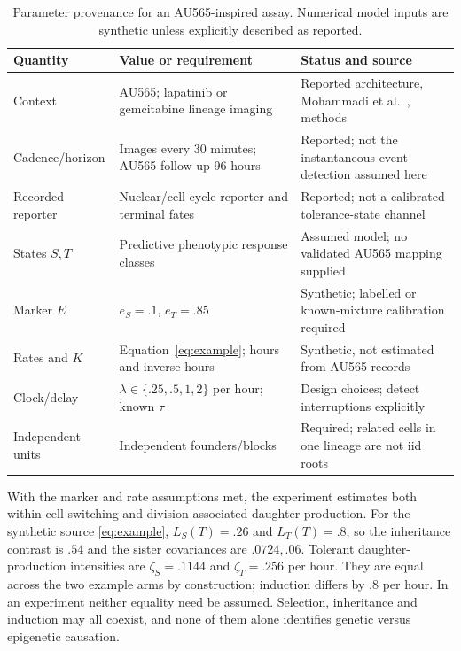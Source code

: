 \documentclass[11pt]{article}
\theoremstyle{definition}
\begin{document}
\begin{table}[tb]
\caption{Parameter provenance for an AU565-inspired assay. Numerical model
inputs are synthetic unless explicitly described as reported.}
\label{tab:provenance}\centering\small
\begin{tabular}{>{\raggedright\arraybackslash}p{.20\linewidth}>{\raggedright\arraybackslash}p{.35\linewidth}>{\raggedright\arraybackslash}p{.35\linewidth}}
\toprule
Quantity & Value or requirement & Status and source\\
\midrule
Context & AU565; lapatinib or gemcitabine lineage imaging & Reported architecture, Mohammadi et al.~\citep{mohammadi2022}, methods\\
Cadence/horizon & Images every 30 minutes; AU565 follow-up 96 hours & Reported; not the instantaneous event detection assumed here\\
Recorded reporter & Nuclear/cell-cycle reporter and terminal fates & Reported; not a calibrated tolerance-state channel\\
States $S,T$ & Predictive phenotypic response classes & Assumed model; no validated AU565 mapping supplied\\
Marker $E$ & $e_S=.1$, $e_T=.85$ & Synthetic; labelled or known-mixture calibration required\\
Rates and $K$ & Equation~\eqref{eq:example}; hours and inverse hours & Synthetic, not estimated from AU565 records\\
Clock/delay & $\lambda\in\{.25,.5,1,2\}$ per hour; known $\tau$ & Design choices; detect interruptions explicitly\\
Independent units & Independent founders/blocks & Required; related cells in one lineage are not iid roots\\
\bottomrule
\end{tabular}
\end{table}

With the marker and rate assumptions met, the experiment estimates both
within-cell switching and division-associated daughter production. For the
synthetic source \eqref{eq:example}, $L_S(T)=.26$ and $L_T(T)=.8$, so the
inheritance contrast is $.54$ and the sister covariances are $.0724,.06$.
Tolerant daughter-production intensities are $\zeta_S=.1144$ and $\zeta_T=.256$
per hour. They are equal across the two example arms by construction; induction
differs by $.8$ per hour. In an experiment neither equality need be assumed.
Selection, inheritance and induction may all coexist, and none of them alone
identifies genetic versus epigenetic causation.
\end{document}
